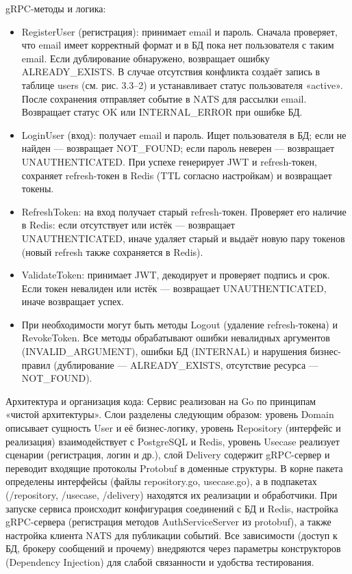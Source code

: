 gRPC-методы и логика:
\begin{itemize}
    \item RegisterUser (регистрация): принимает email и пароль. Сначала проверяет, что email имеет корректный формат и в БД пока нет пользователя с таким email. Если дублирование обнаружено, возвращает ошибку ALREADY\_EXISTS. В случае отсутствия конфликта создаёт запись в таблице users (см. рис. 3.3–2) и устанавливает статус пользователя «active». После сохранения отправляет событие в NATS для рассылки email. Возвращает статус OK или INTERNAL\_ERROR при ошибке БД.
    \item LoginUser (вход): получает email и пароль. Ищет пользователя в БД; если не найден — возвращает NOT\_FOUND; если пароль неверен — возвращает UNAUTHENTICATED. При успехе генерирует JWT и refresh-токен, сохраняет refresh-токен в Redis (TTL согласно настройкам) и возвращает токены.
    \item RefreshToken: на вход получает старый refresh-токен. Проверяет его наличие в Redis: если отсутствует или истёк — возвращает \\ UNAUTHENTICATED, иначе удаляет старый и выдаёт новую пару токенов (новый refresh также сохраняется в Redis).
    \item ValidateToken: принимает JWT, декодирует и проверяет подпись и срок. Если токен невалиден или истёк — возвращает UNAUTHENTICATED, иначе возвращает успех.
    \item При необходимости могут быть методы Logout (удаление refresh-токена) и RevokeToken. Все методы обрабатывают ошибки невалидных аргументов (INVALID\_ARGUMENT), ошибки БД (INTERNAL) и нарушения бизнес-правил (дублирование — ALREADY\_EXISTS, отсутствие ресурса — NOT\_FOUND).
\end{itemize}
Архитектура и организация кода: Сервис реализован на Go по принципам «чистой архитектуры». Слои разделены следующим образом: уровень Domain описывает сущность User и её бизнес-логику, уровень Repository (интерфейс и реализация) взаимодействует с PostgreSQL и Redis, уровень Usecase реализует сценарии (регистрация, логин и др.), слой Delivery содержит gRPC-сервер и переводит входящие протоколы Protobuf в доменные структуры. В корне пакета определены интерфейсы (файлы repository.go, usecase.go), а в подпакетах (/repository, /usecase, /delivery) находятся их реализации и обработчики. При запуске сервиса происходит конфигурация соединений с БД и Redis, настройка gRPC-сервера (регистрация методов AuthServiceServer из protobuf), а также настройка клиента NATS для публикации событий. Все зависимости (доступ к БД, брокеру сообщений и прочему) внедряются через параметры конструкторов (Dependency Injection) для слабой связанности и удобства тестирования.

